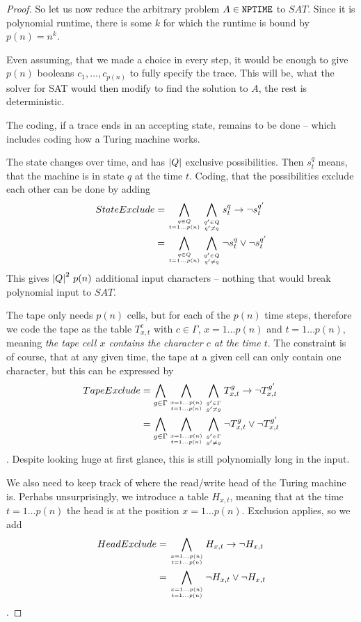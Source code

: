 \begin{proof}
	So let us now reduce the arbitrary problem $A\in\mathtt{NPTIME}$ to $SAT$. Since it 
	is polynomial runtime, there is some $k$ for which the runtime is bound by 
	$p(n) = n^k$.

	Even assuming, that we made a choice in every step, it would be enough to
	give $p(n)$ booleans $c_1, \dots, c_{p(n)}$ to fully specify the trace. This
	will be, what the solver for SAT would then modify to find the solution to
	$A$, the rest is deterministic. 

	The coding, if a trace ends in an accepting state, remains to be done -- 
	which includes coding how a Turing machine works. 

	The state changes over time, and has $\left|Q\right|$ exclusive possibilities.
	Then $s^q_{t}$ means, that the machine is in state $q$ at the time $t$. 
	Coding, that the possibilities exclude each other can be done by adding 
	\begin{align}
		StateExclude &= \bigwedge_{q\in Q \atop t=1\ldots p(n)}{
		\bigwedge_{q'\in Q\atop q' \neq q}{s^q_{t} \rightarrow \lnot 
		s^{q'}_{t} }}\\
		&= \bigwedge_{q\in Q \atop t=1\ldots p(n)} 
		\bigwedge_{q'\in Q\atop q' \neq q} \lnot s^q_{t} \vee \lnot 
		s^{q'}_{t}
	\end{align}
	This gives $\left|Q\right|^2\,p(n)$ additional input characters -- nothing that would 
	break polynomial input to $SAT$.

	The tape only needs $p(n)$ cells, but for each of the $p(n)$ time steps, 
	therefore we code the tape as the table $T^c_{x, t}$ with $c\in\Gamma$, 
	$x = 1\ldots p(n)$ and $t=1\ldots p(n)$, meaning \emph{the tape cell $x$ 
	contains the character $c$ at the time $t$}. The constraint is of course, 
	that at any given time, the tape at a given cell can only contain one 
	character, but this can be expressed by
	\begin{align}
		TapeExclude &= \bigwedge_{g\in \Gamma}\bigwedge_{x=1\ldots p(n) \atop t=1\ldots p(n)}
		\bigwedge_{g'\in \Gamma\atop g' \neq g}{T^g_{x,t} \rightarrow \lnot 
		T^{g'}_{x,t} }\\
		&= \bigwedge_{g\in \Gamma}\bigwedge_{x=1\ldots p(n) \atop t=1\ldots p(n)} 
		\bigwedge_{g'\in \Gamma\atop g' \neq g} \lnot T^g_{x,t} \vee \lnot 
		T^{g'}_{x,t}
	\end{align}.
	Despite looking huge at first glance, this is still polynomially long in the input.

	We also need to keep track of where the read/write head of the Turing 
	machine is. Perhabs unsurprisingly, we introduce a table $H_{x,t}$, meaning 
	that at the time $t=1\ldots p(n)$ the head is at the position 
	$x=1\ldots p(n)$. Exclusion applies, so we add
	\begin{align}
		HeadExclude &= \bigwedge_{x=1\ldots p(n) \atop t=1\ldots p(n)}
		{H_{x,t} \rightarrow \lnot H_{x,t} }\\
		&= \bigwedge_{x=1\ldots p(n) \atop t=1\ldots p(n)} \lnot H_{x,t} \vee \lnot 
		H_{x,t}
	\end{align}.


\end{proof}
